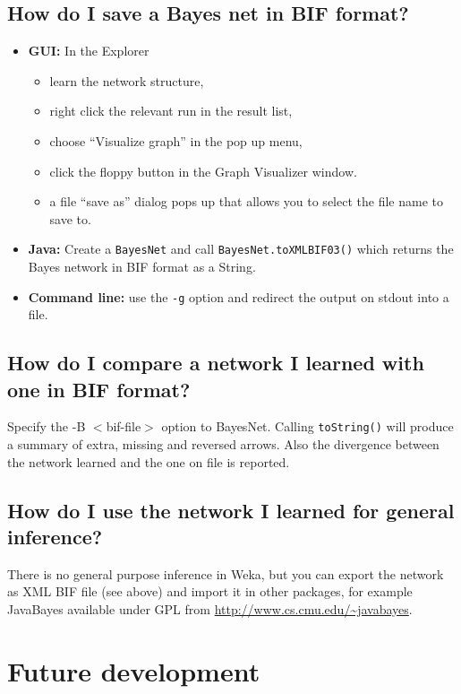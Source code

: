 \subsection*{How do I save a Bayes net in BIF format?}
\begin{itemize}
\item {\bf GUI:} In the Explorer
\begin{itemize}
\item learn the network structure,
\item right click the relevant run in the result list,
\item choose ``Visualize graph'' in the pop up menu,
\item click the floppy button in the Graph Visualizer window.
\item a file ``save as'' dialog pops up that allows you to select the file name to save to.
\end{itemize}

\item {\bf Java:} Create a {\tt BayesNet} and call {\tt BayesNet.toXMLBIF03()}
which returns the Bayes network in BIF format as a String.

\item {\bf Command line:} use the {\tt -g} option and redirect the output on stdout into a file.
\end{itemize}

\subsection*{How do I compare a network I learned with one in BIF format?}
Specify the -B $<$bif-file$>$ option to BayesNet. 
Calling {\tt toString()} will produce a summary of extra, missing and reversed arrows.
Also the divergence between the network learned and the one on file is reported.

\subsection*{How do I use the network I learned for general inference?}
There is no general purpose inference in Weka, but you can export the
network as XML BIF file (see above) and import it in other packages,
for example JavaBayes available under GPL from
\url{http://www.cs.cmu.edu/\~javabayes}{}.


\section{Future development}

